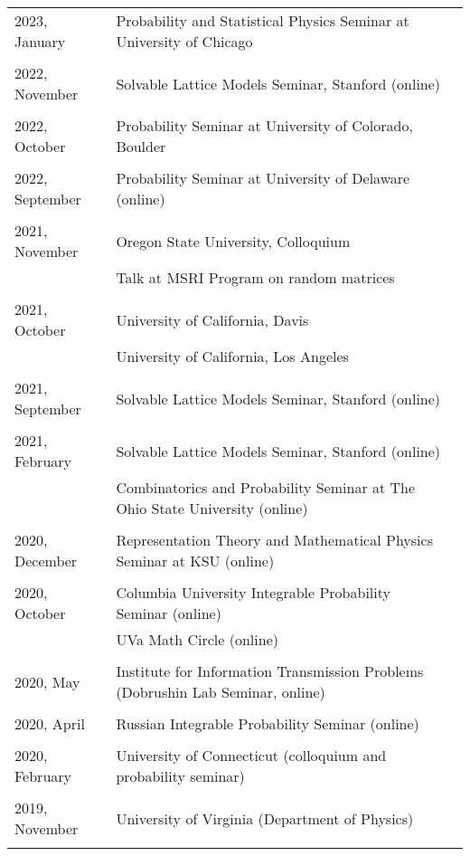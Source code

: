 \documentclass[letterpaper,11pt]{article}
\begin{document}
\begin{longtable}{llc}
	2023, January
	& Probability and Statistical Physics Seminar at University of Chicago 
	\\\\
	2022, November
	& Solvable Lattice Models Seminar, Stanford (online)
	\\\\
	2022, October
	& Probability Seminar at University of Colorado, Boulder
	\\\\
	2022, September
	& Probability Seminar at University of Delaware (online)
	\\\\
	2021, November
	& Oregon State University, Colloquium
	\\
	& Talk at MSRI Program on random matrices
	\\\\
	2021, October
	& University of California, Davis
	\\
	& University of California, Los Angeles
	\\\\
	2021, September 
	& Solvable Lattice Models Seminar, Stanford (online)
	\\\\
	2021, February 
	& Solvable Lattice Models Seminar, Stanford (online)
	\\
	&
	Combinatorics and Probability Seminar at The Ohio State University (online)
	\\\\
	2020, December
	& Representation Theory and Mathematical Physics Seminar at KSU (online)
	\\\\
	2020, October
	& Columbia University Integrable Probability Seminar (online)
	\\
	&
	UVa Math Circle (online)
	\\\\
	2020, May
	& Institute for Information Transmission Problems
	(Dobrushin Lab Seminar, online)
	\\\\
	2020, April
	& Russian Integrable Probability Seminar (online)
	\\\\
	2020, February
	& University of Connecticut (colloquium and probability seminar)
	\\\\
	2019, November
	& University of Virginia (Department of Physics)
	\\\\

\end{longtable}
\end{document}
